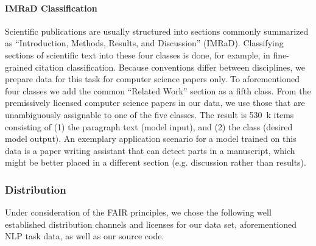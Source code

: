 \paragraph{IMRaD Classification}
Scientific publications are usually structured into sections commonly summarized as ``Introduction, Methods, Results, and Discussion'' (IMRaD). Classifying sections of scientific text into these four classes is done, for example, in fine-grained citation classification. %
Because conventions differ between disciplines, we prepare data for this task for computer science papers only. To aforementioned four classes we add the common ``Related Work'' section as a fifth class. From the premissively licensed computer science papers in our data, we use those that are unambiguously assignable to one of the five classes. The result is 530~k items consisting of (1) the paragraph text (model input), and (2) the class (desired model output). An exemplary application scenario for a model trained on this data is a paper writing assistant that can detect parts in a manuscript, which might be better placed in a different section (e.g. discussion rather than results).



\subsubsection{Distribution}


Under consideration of the FAIR principles, we chose the following well established distribution channels and licenses for our data set, aforementioned NLP task data, as well as our source code.

